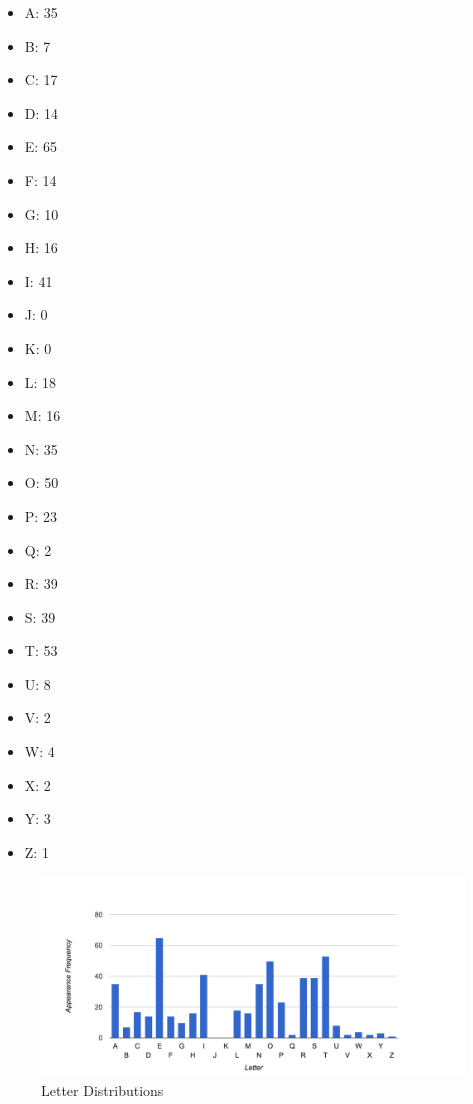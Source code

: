 \documentclass[]{article}
\begin{document}
\begin{multicols}{7}
	\begin{itemize}
		\item A: 35
		\item B: 7
		\item C: 17
		\item D: 14
		\item E: 65
		\item F: 14
		\item G: 10
		\item H: 16
		\item I: 41
		\item J: 0
		\item K: 0
		\item L: 18
		\item M: 16
		\item N: 35
		\item O: 50
		\item P: 23
		\item Q: 2
		\item R: 39
		\item S: 39
		\item T: 53
		\item U: 8
		\item V: 2
		\item W: 4
		\item X: 2
		\item Y: 3
		\item Z: 1
	\end{itemize}
\end{multicols}

\begin{figure}[H]
	\includegraphics[width=18cm]{frequency.png}
	\caption{Letter Distributions}
	\centering
\end{figure}

\break
\end{document}
